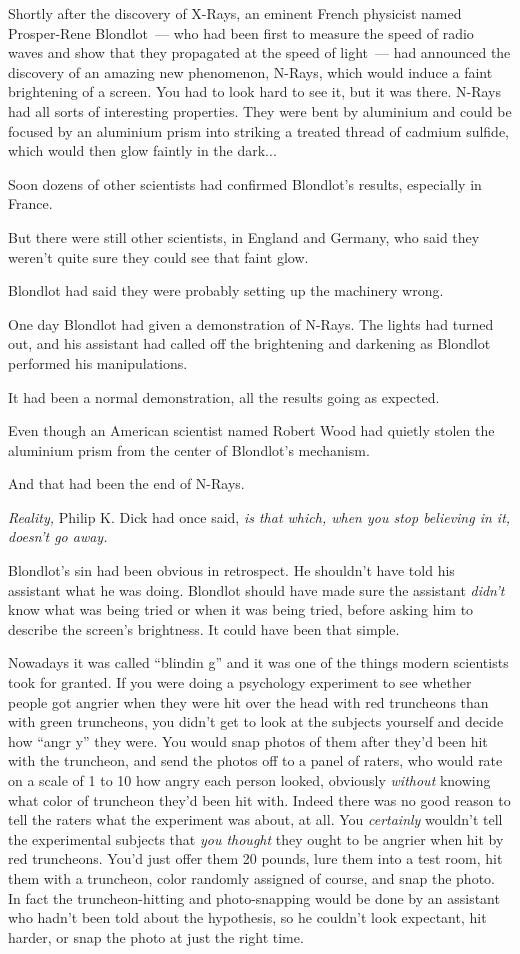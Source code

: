 Shortly after the discovery of X-Rays, an eminent French physicist named Prosper-Rene Blondlot~--- who had been first to measure the speed of radio waves and show that they propagated at the speed of light~--- had announced the discovery of an amazing new phenomenon, N-Rays, which would induce a faint brightening of a screen. You had to look hard to see it, but it was there. N-Rays had all sorts of interesting properties. They were bent by aluminium and could be focused by an aluminium prism into striking a treated thread of cadmium sulfide, which would then glow faintly in the dark...

Soon dozens of other scientists had confirmed Blondlot's results, especially in France.

But there were still other scientists, in England and Germany, who said they weren't quite sure they could see that faint glow.

Blondlot had said they were probably setting up the machinery wrong.

One day Blondlot had given a demonstration of N-Rays. The lights had turned out, and his assistant had called off the brightening and darkening as Blondlot performed his manipulations.

It had been a normal demonstration, all the results going as expected.

Even though an American scientist named Robert Wood had quietly stolen the aluminium prism from the center of Blondlot's mechanism.

And that had been the end of N-Rays.

\emph{Reality,} Philip K. Dick had once said, \emph{is that which, when you stop believing in it, doesn't go away.}

Blondlot's sin had been obvious in retrospect. He shouldn't have told his assistant what he was doing. Blondlot should have made sure the assistant \emph{didn't} know what was being tried or when it was being tried, before asking him to describe the screen's brightness. It could have been that simple.

Nowadays it was called ``blindin g'' and it was one of the things modern scientists took for granted. If you were doing a psychology experiment to see whether people got angrier when they were hit over the head with red truncheons than with green truncheons, you didn't get to look at the subjects yourself and decide how ``angr y'' they were. You would snap photos of them after they'd been hit with the truncheon, and send the photos off to a panel of raters, who would rate on a scale of 1 to 10 how angry each person looked, obviously \emph{without} knowing what color of truncheon they'd been hit with. Indeed there was no good reason to tell the raters what the experiment was about, at all. You \emph{certainly} wouldn't tell the experimental subjects that \emph{you thought} they ought to be angrier when hit by red truncheons. You'd just offer them 20 pounds, lure them into a test room, hit them with a truncheon, color randomly assigned of course, and snap the photo. In fact the truncheon-hitting and photo-snapping would be done by an assistant who hadn't been told about the hypothesis, so he couldn't look expectant, hit harder, or snap the photo at just the right time.

